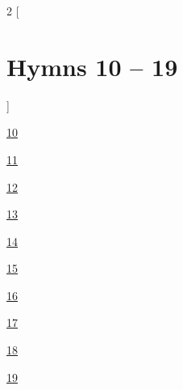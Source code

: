\newpage

\hypertarget{EOG01x}{}
\begin{multicols}{2}
[
\section*{Hymns 10 -- 19}
]

\hyperlink{EOG010}{10}

\hyperlink{EOG011}{11}

\hyperlink{EOG012}{12}

\hyperlink{EOG013}{13}

\hyperlink{EOG014}{14}

\hyperlink{EOG015}{15}

\hyperlink{EOG016}{16}

\hyperlink{EOG017}{17}

\hyperlink{EOG018}{18}

\hyperlink{EOG019}{19}

\end{multicols}

\restoregeometry
